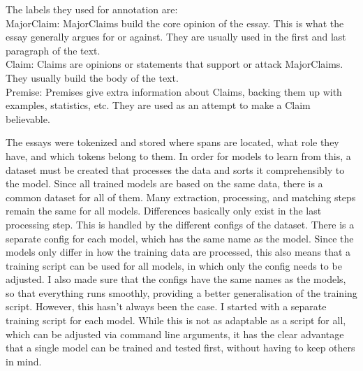 \documentclass[12]{article}
\theoremstyle{mytheoremstyle}
\theoremstyle{mytheoremstyle}
\theoremstyle{myproblemstyle}
\begin{document}
  The labels they used for annotation are:\\
  MajorClaim: MajorClaims build the core opinion of the essay. 
  This is what the essay generally argues for or against. 
  They are usually used in the first and last paragraph of the text.\\
  Claim: Claims are opinions or statements that support or attack MajorClaims. 
  They usually build the body of the text.\\
  Premise: Premises give extra information about Claims, backing them up with examples, statistics, etc.
  They are used as an attempt to make a Claim believable.

  The essays were tokenized and stored where spans are located, what role they have, and which tokens belong to them. 
  In order for models to learn from this, a dataset must be created that processes the data and sorts it comprehensibly to the model. 
  Since all trained models are based on the same data, there is a common dataset for all of them. 
  Many extraction, processing, and matching steps remain the same for all models. 
  Differences basically only exist in the last processing step. 
  This is handled by the different configs of the dataset. 
  There is a separate config for each model, which has the same name as the model. 
  Since the models only differ in how the training data are processed, this also means that a training script can be used for all models, in which only the config needs to be adjusted. 
  I also made sure that the configs have the same names as the models, so that everything runs smoothly, providing a better generalisation of the training script. 
  However, this hasn't always been the case. 
  I started with a separate training script for each model. 
  While this is not as adaptable as a script for all, which can be adjusted via command line arguments, it has the clear advantage that a single model can be trained and tested first, without having to keep others in mind.
\end{document}
